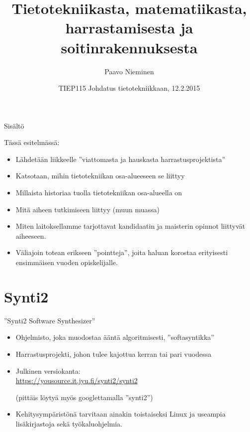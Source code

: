 \documentclass[pdf,10pt]{beamer}
\title[TIEP115]
{Tietotekniikasta, matematiikasta, harrastamisesta ja soitinrakennuksesta}
\author{Paavo Nieminen}
\date{TIEP115 Johdatus tietotekniikkaan, 12.2.2015}
\begin{document}
\begin{frame}
  \titlepage
\end{frame}

\begin{frame}{Sisältö}

{
\setlength{\parskip}{\smallskipamount}
  \tableofcontents
}
\end{frame}

\begin{frame}{Tässä esitelmässä:}
  \begin{itemize}
  \item Lähdetään liikkeelle ''viattomasta ja hauskasta harrastusprojektista''
  \item Katsotaan, mihin tietotekniikan osa-alueeseen se liittyy
  \item Millaista historiaa tuolla tietotekniikan osa-alueella on
  \item Mitä aiheen tutkimiseen liittyy (muun muassa)
  \item Miten laitoksellamme tarjottavat kandidaatin ja maisterin
    opinnot liittyvät aiheeseen.
  \item Väliajoin totean erikseen ''pointteja'', joita haluan korostaa
    erityisesti ensimmäisen vuoden opiskelijalle.
  \end{itemize}
\end{frame}


\section{Synti2}
\begin{frame}{''Synti2 Software Synthesizer''}
\begin{itemize}
  \item Ohjelmisto, joka muodostaa ääntä algoritmisesti,
    ''softasyntikka''
  \item Harrastusprojekti, johon tulee kajottua kerran tai pari vuodessa
  \item Julkinen versiokanta:\\ \small{\url{https://yousource.it.jyu.fi/synti2/synti2}}

    (pittäis löytyä myös googlettamalla ''synti2'')

  \item Kehitysympäristönä tarvitaan ainakin toistaiseksi Linux ja
    useampia lisäkirjastoja sekä työkaluohjelmia.

\end{itemize}
\end{frame}
\end{document}

